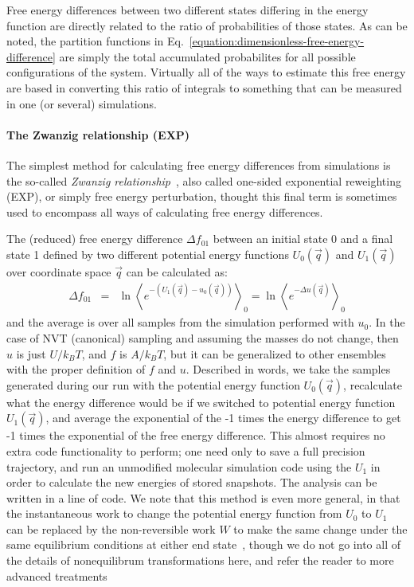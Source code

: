 \documentclass[9pt,bestpractices]{livecoms}
\newcommand{\expect}[1]{\left\langle{#1}\right\rangle}
\begin{document}
Free energy differences between two different states differing in the energy function are directly related to the
ratio of probabilities of those states.
As can be noted, the partition functions in Eq.~\ref{equation:dimensionless-free-energy-difference} are simply the total accumulated probabilites for all possible configurations of the system. Virtually all of the ways to estimate this free energy are based in converting this ratio of integrals to something that can be measured in one (or several) simulations.  

\paragraph{The Zwanzig relationship (EXP)}

The simplest method for calculating free energy
differences from simulations is the so-called \textit{Zwanzig
relationship}~\cite{zwanzig1954hightemperature}, also called one-sided exponential reweighting (EXP), or simply free energy perturbation, thought this final term is sometimes used to encompass all ways of calculating free energy differences.

The (reduced) free energy difference $\Delta f_{01}$ between an initial state 0 and a final state 1 defined by two different potential energy functions 
$U_0(\vec{q})$ and $U_1(\vec{q})$ over coordinate space $\vec{q}$ can be calculated as:
\begin{eqnarray}
\Delta f_{01} & = & \ln \expect{e^{-(U_1(\vec{q}) - u_0(\vec{q}))}}_0 =  \ln \expect{e^{-\Delta u(\vec{q})} }_0
\end{eqnarray}\label{eqn.zwanzig}
and the average is over all samples from the simulation performed with $u_0$. In the case of NVT (canonical) sampling and assuming the masses do not change, then $u$ is just $U/k_BT$, and $f$ is $A/k_BT$, but it can be generalized to other ensembles with the proper definition of $f$ and $u$.
Described in words, we take the samples generated during our run with the potential energy function $U_0(\vec{q})$, recalculate what the energy difference would be if we switched to potential energy function $U_1(\vec{q})$, and average the exponential of the -1 times the energy difference to get -1 times the exponential of the free energy difference.   This almost requires no extra code functionality to perform; one need only to save a full precision trajectory, and run an unmodified molecular simulation code using the $U_1$ in order to calculate the new energies of stored snapshots.  The analysis can be written in a line of code.  We note that this method is even more general, in that the instantaneous work to change the potential energy function from $U_0$ to $U_1$ can be replaced by the non-reversible work $W$ to make the same change under the same equilibrium conditions at either end state~\cite{jarzynski1997nonequilibrium,jarzynski1998equilibrium,crooks2000pathensemble}, though we do not go into all of the details of nonequilibrum transformations here, and refer the reader to more advanced treatments~\cite{maragakis2008bayesian,oberhofer2005biased,procacci2015unbiased,shirts2003equilibriuma,ytreberg2004singleensemble}
\end{document}
